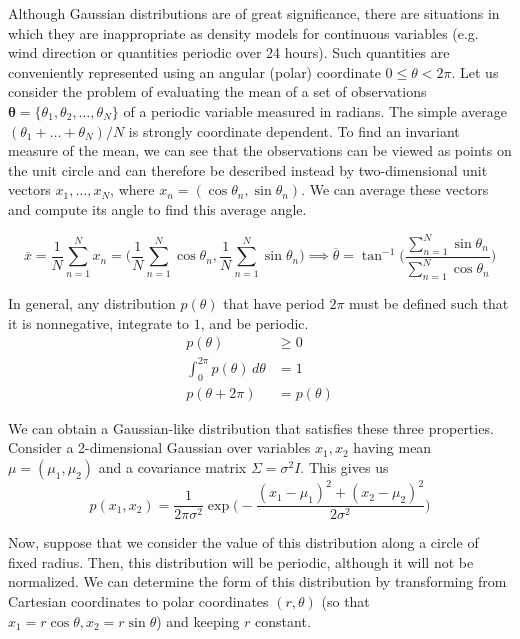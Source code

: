 \documentclass{article}
\begin{document}
    Although Gaussian distributions are of great significance, there are situations in which they are inappropriate as density models for continuous variables (e.g. wind direction or quantities periodic over 24 hours). Such quantities are conveniently represented using an angular (polar) coordinate $0 \leq \theta < 2\pi$. Let us consider the problem of evaluating the mean of a set of observations $\mathbf{\theta} = \{\theta_1, \theta_2, \ldots, \theta_N\}$ of a periodic variable measured in radians. The simple average $(\theta_1 + \ldots + \theta_N)/N$ is strongly coordinate dependent. To find an invariant measure of the mean, we can see that the observations can be viewed as points on the unit circle and can therefore be described instead by two-dimensional unit vectors $x_1, \ldots, x_N$, where $x_n = (\cos{\theta_n}, \sin{\theta_n})$. We can average these vectors and compute its angle to find this average angle.

    \begin{equation}
      \overline{x} = \frac{1}{N} \sum_{n=1}^N x_n = \Big( \frac{1}{N} \sum_{n=1}^N \cos{\theta_n} , \frac{1}{N} \sum_{n=1}^N \sin{\theta_n} \Big) \implies \overline{\theta} = \tan^{-1} \bigg( \frac{\sum_{n=1}^N \sin{\theta_n}}{\sum_{n=1}^N \cos{\theta_n}} \bigg)
    \end{equation}

    In general, any distribution $p(\theta)$ that have period $2\pi$ must be defined such that it is nonnegative, integrate to $1$, and be periodic.
    \begin{align*} 
      p(\theta) & \geq 0 \\
      \int_0^{2\pi} p(\theta)\,d\theta  & = 1 \\
      p(\theta + 2\pi) & = p(\theta)
    \end{align*}

    We can obtain a Gaussian-like distribution that satisfies these three properties. Consider a 2-dimensional Gaussian over variables $x_1, x_2$ having mean $\mu = (\mu_1, \mu_2)$ and a covariance matrix $\Sigma = \sigma^2 I$. This gives us
    \begin{equation}
      p(x_1, x_2) = \frac{1}{2\pi \sigma^2} \exp \bigg( -\frac{(x_1 - \mu_1)^2 + (x_2 - \mu_2)^2}{2\sigma^2} \bigg)
    \end{equation}

    Now, suppose that we consider the value of this distribution along a circle of fixed radius. Then, this distribution will be periodic, although it will not be normalized. We can determine the form of this distribution by transforming from Cartesian coordinates to polar coordinates $(r, \theta)$ (so that $x_1 = r \cos{\theta}, x_2 = r \sin{\theta}$) and keeping $r$ constant.
\end{document}
